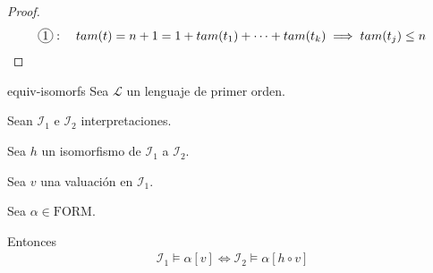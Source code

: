 \begin{proof}
    \begin{gather*}
        \circled{1}: \quad
        tam(t) = n+1 = 1 + tam(t_1) + \cdots + tam(t_k) \implies
        tam(t_j) \leq n
    \end{gather*}

\end{proof}

\begin{teorema}{}{equiv-isomorfs}
Sea $\mathcal{L}$ un lenguaje de primer orden. 

Sean $\mathcal{I}_1$ e $\mathcal{I}_2$ interpretaciones.

Sea $h$ un isomorfismo de $\mathcal{I}_1$ a $\mathcal{I}_2$.

Sea $v$ una valuación en $\mathcal{I}_1$.

Sea $\alpha \in \mathrm{FORM}$.

\medskip

Entonces
\begin{gather*}
    \mathcal{I}_1 \vDash \alpha[v] \iff \mathcal{I}_2 \vDash \alpha[h \circ v]
\end{gather*}
\end{teorema}


